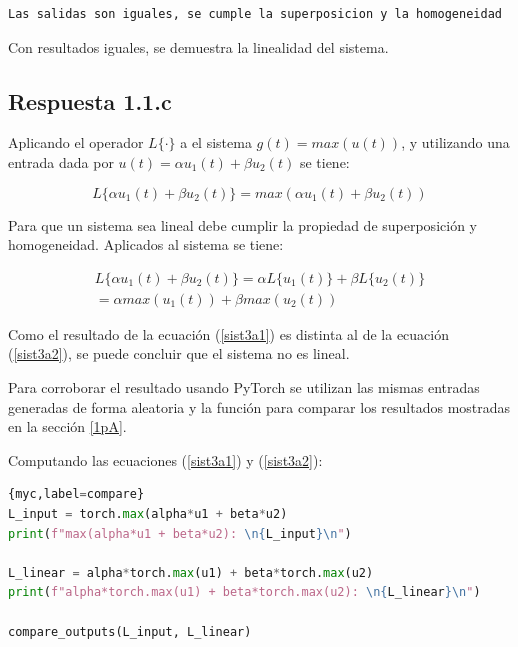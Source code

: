 \documentclass[12 pt]{article}
\begin{document}
\begin{enumerate}
\begin{lstlisting}
Las salidas son iguales, se cumple la superposicion y la homogeneidad
\end{lstlisting}

Con resultados iguales, se demuestra la linealidad del sistema.

\subsection{Respuesta 1.1.c}

Aplicando el operador ${L\{ \cdot \}}$ a el sistema ${g(t)=max(u(t))}$, y utilizando una entrada dada por ${u(t)=\alpha u_{1}(t) + \beta u_{2}(t)}$ se tiene:

\begin{equation}
\label{sist3a1}
    L\{ \alpha u_{1}(t) + \beta u_{2}(t) \} = max(\alpha u_{1}(t) + \beta u_{2}(t)) 
\end{equation}

Para que un sistema sea lineal debe cumplir la propiedad de superposición y homogeneidad. Aplicados al sistema se tiene:

\begin{center}
\begin{equation} \label{sist3a2}
\begin{split}
 L\{ \alpha u_{1}(t) + \beta u_{2}(t) \} = \alpha L\{ u_{1}(t) \} + \beta L\{ u_{2}(t) \} \\
 = \alpha max(u_{1}(t)) + \beta max(u_{2}(t))
\end{split}
\end{equation}
\end{center}

Como el resultado de la ecuación (\ref{sist3a1}) es distinta al de la ecuación (\ref{sist3a2}), se puede concluir que el sistema no es lineal.

Para corroborar el resultado usando PyTorch se utilizan las mismas entradas generadas de forma aleatoria y la función para comparar los resultados mostradas en la sección \ref{1pA}.

Computando las ecuaciones (\ref{sist3a1}) y (\ref{sist3a2}):

\begin{lstlisting}[language=Python]{myc,label=compare}
L_input = torch.max(alpha*u1 + beta*u2)
print(f"max(alpha*u1 + beta*u2): \n{L_input}\n")

L_linear = alpha*torch.max(u1) + beta*torch.max(u2)
print(f"alpha*torch.max(u1) + beta*torch.max(u2): \n{L_linear}\n")

compare_outputs(L_input, L_linear)
\end{lstlisting}


\end{enumerate}
\end{document}
